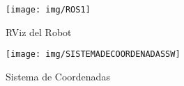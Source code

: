 \begin{figure}
	\centering
	\texttt{[image: img/ROS1]}
	\caption{RViz del Robot}
	\label{fig:ros1}
\end{figure}

\begin{figure}
	\centering
	\texttt{[image: img/SISTEMADECOORDENADASSW]}
	\caption{Sistema de Coordenadas}
	\label{fig:sistemadecoordenadassw}
\end{figure}



